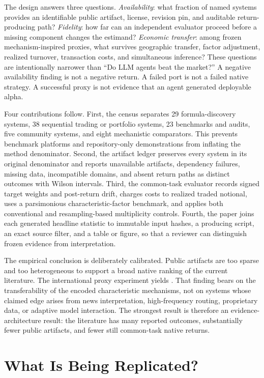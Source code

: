 \documentclass[11pt]{article}
\begin{document}
The design answers three questions. \emph{Availability}: what fraction of named systems provides an identifiable public artifact, license, revision pin, and auditable return-producing path? \emph{Fidelity}: how far can an independent evaluator proceed before a missing component changes the estimand? \emph{Economic transfer}: among frozen mechanism-inspired proxies, what survives geographic transfer, factor adjustment, realized turnover, transaction costs, and simultaneous inference? These questions are intentionally narrower than ``Do LLM agents beat the market?'' A negative availability finding is not a negative return. A failed port is not a failed native strategy. A successful proxy is not evidence that an agent generated deployable alpha.

Four contributions follow. First, the census separates 29 formula-discovery systems, 38 sequential trading or portfolio systems, 23 benchmarks and audits, five community systems, and eight mechanistic comparators. This prevents benchmark platforms and repository-only demonstrations from inflating the method denominator. Second, the artifact ledger preserves every system in its original denominator and reports unavailable artifacts, dependency failures, missing data, incompatible domains, and absent return paths as distinct outcomes with Wilson intervals. Third, the common-task evaluator records signed target weights and post-return drift, charges costs to realized traded notional, uses a parsimonious characteristic-factor benchmark, and applies both conventional and resampling-based multiplicity controls. Fourth, the paper joins each generated headline statistic to immutable input hashes, a producing script, an exact source filter, and a table or figure, so that a reviewer can distinguish frozen evidence from interpretation.

The empirical conclusion is deliberately calibrated. Public artifacts are too sparse and too heterogeneous to support a broad native ranking of the current literature. The international proxy experiment yields \ResultHeadline{}. That finding bears on the transferability of the encoded characteristic mechanisms, not on systems whose claimed edge arises from news interpretation, high-frequency routing, proprietary data, or adaptive model interaction. The strongest result is therefore an evidence-architecture result: the literature has many reported outcomes, substantially fewer public artifacts, and fewer still common-task native returns.

\section{What Is Being Replicated?}\label{sec:estimands}
\end{document}

